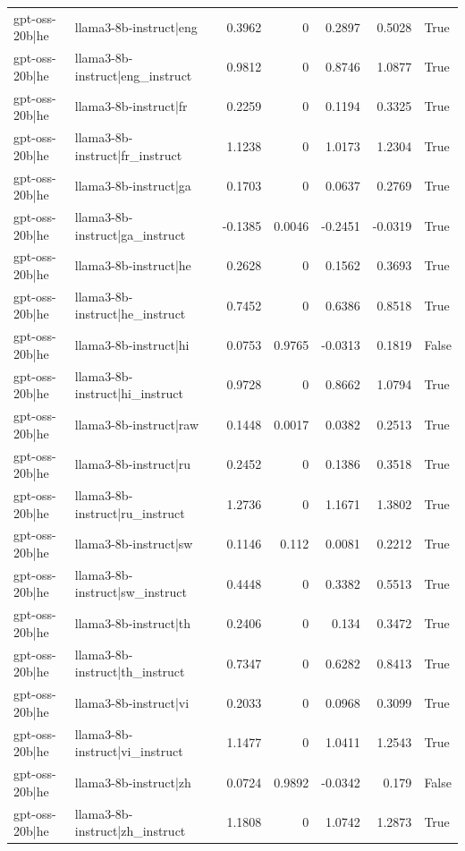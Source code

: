 \begin{table}
\begin{tabular}{l l r r r r l}
gpt-oss-20b|he & llama3-8b-instruct|eng & 0.3962 & 0 & 0.2897 & 0.5028 & True \\
gpt-oss-20b|he & llama3-8b-instruct|eng_instruct & 0.9812 & 0 & 0.8746 & 1.0877 & True \\
gpt-oss-20b|he & llama3-8b-instruct|fr & 0.2259 & 0 & 0.1194 & 0.3325 & True \\
gpt-oss-20b|he & llama3-8b-instruct|fr_instruct & 1.1238 & 0 & 1.0173 & 1.2304 & True \\
gpt-oss-20b|he & llama3-8b-instruct|ga & 0.1703 & 0 & 0.0637 & 0.2769 & True \\
gpt-oss-20b|he & llama3-8b-instruct|ga_instruct & -0.1385 & 0.0046 & -0.2451 & -0.0319 & True \\
gpt-oss-20b|he & llama3-8b-instruct|he & 0.2628 & 0 & 0.1562 & 0.3693 & True \\
gpt-oss-20b|he & llama3-8b-instruct|he_instruct & 0.7452 & 0 & 0.6386 & 0.8518 & True \\
gpt-oss-20b|he & llama3-8b-instruct|hi & 0.0753 & 0.9765 & -0.0313 & 0.1819 & False \\
gpt-oss-20b|he & llama3-8b-instruct|hi_instruct & 0.9728 & 0 & 0.8662 & 1.0794 & True \\
gpt-oss-20b|he & llama3-8b-instruct|raw & 0.1448 & 0.0017 & 0.0382 & 0.2513 & True \\
gpt-oss-20b|he & llama3-8b-instruct|ru & 0.2452 & 0 & 0.1386 & 0.3518 & True \\
gpt-oss-20b|he & llama3-8b-instruct|ru_instruct & 1.2736 & 0 & 1.1671 & 1.3802 & True \\
gpt-oss-20b|he & llama3-8b-instruct|sw & 0.1146 & 0.112 & 0.0081 & 0.2212 & True \\
gpt-oss-20b|he & llama3-8b-instruct|sw_instruct & 0.4448 & 0 & 0.3382 & 0.5513 & True \\
gpt-oss-20b|he & llama3-8b-instruct|th & 0.2406 & 0 & 0.134 & 0.3472 & True \\
gpt-oss-20b|he & llama3-8b-instruct|th_instruct & 0.7347 & 0 & 0.6282 & 0.8413 & True \\
gpt-oss-20b|he & llama3-8b-instruct|vi & 0.2033 & 0 & 0.0968 & 0.3099 & True \\
gpt-oss-20b|he & llama3-8b-instruct|vi_instruct & 1.1477 & 0 & 1.0411 & 1.2543 & True \\
gpt-oss-20b|he & llama3-8b-instruct|zh & 0.0724 & 0.9892 & -0.0342 & 0.179 & False \\
gpt-oss-20b|he & llama3-8b-instruct|zh_instruct & 1.1808 & 0 & 1.0742 & 1.2873 & True \\

\end{tabular}
\end{table}
